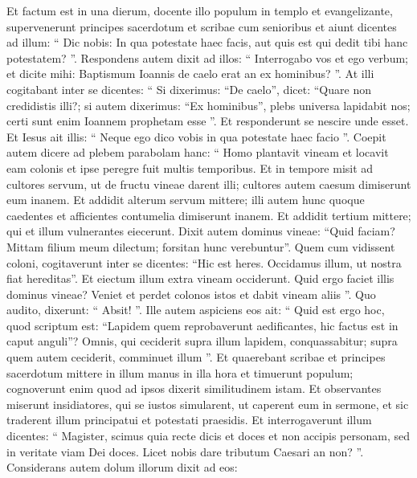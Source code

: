 \begin{biblechapter}
\begin{biblechapter}
\begin{biblechapter}
\begin{biblechapter}
\begin{biblechapter}
\begin{biblechapter}
\begin{biblechapter}
\begin{biblechapter}
\begin{biblechapter}
\begin{biblechapter}
\begin{biblechapter}
\begin{biblechapter}
\begin{biblechapter}
\begin{biblechapter}
\begin{biblechapter}
\begin{biblechapter}
\begin{biblechapter}
\begin{biblechapter}
\begin{biblechapter}
\begin{biblechapter}
\verse Et factum est in una dierum, docente illo populum in templo et evangelizante, supervenerunt principes sacerdotum et scribae cum senioribus 
 \verse et aiunt dicentes ad illum: “ Dic nobis: In qua potestate haec facis, aut quis est qui dedit tibi hanc potestatem? ”. 
\verse Respondens autem dixit ad illos: “ Interrogabo vos et ego verbum; et dicite mihi: 
\verse Baptismum Ioannis de caelo erat an ex hominibus? ”. 
\verse At illi cogitabant inter se dicentes: “ Si dixerimus: “De caelo”, dicet: “Quare non credidistis illi?; 
\verse si autem dixerimus: “Ex hominibus”, plebs universa lapidabit nos; certi sunt enim Ioannem prophetam esse ”. 
\verse Et responderunt se nescire unde esset. 
\verse Et Iesus ait illis: “ Neque ego dico vobis in qua potestate haec facio ”.
 \verse Coepit autem dicere ad plebem parabolam hanc: “ Homo plantavit vineam et locavit eam colonis et ipse peregre fuit multis temporibus. 
\verse Et in tempore misit ad cultores servum, ut de fructu vineae darent illi; cultores autem caesum dimiserunt eum inanem. 
\verse Et addidit alterum servum mittere; illi autem hunc quoque caedentes et afficientes contumelia dimiserunt inanem. 
\verse Et addidit tertium mittere; qui et illum vulnerantes eiecerunt. 
\verse Dixit autem dominus vineae: “Quid faciam? Mittam filium meum dilectum; forsitan hunc verebuntur”. 
\verse Quem cum vidissent coloni, cogitaverunt inter se dicentes: “Hic est heres. Occidamus illum, ut nostra fiat hereditas”. 
\verse Et eiectum illum extra vineam occiderunt. Quid ergo faciet illis dominus vineae? 
\verse Veniet et perdet colonos istos et dabit vineam aliis ”.
 Quo audito, dixerunt: “ Absit! ”. 
\verse Ille autem aspiciens eos ait: “ Quid est ergo hoc, quod scriptum est:
 “Lapidem quem reprobaverunt aedificantes,
 hic factus est in caput anguli”?
 \verse Omnis, qui ceciderit supra illum lapidem, conquassabitur; supra quem autem ceciderit, comminuet illum ”. 
\verse Et quaerebant scribae et principes sacerdotum mittere in illum manus in illa hora et timuerunt populum; cognoverunt enim quod ad ipsos dixerit similitudinem istam.
 \verse Et observantes miserunt insidiatores, qui se iustos simularent, ut caperent eum in sermone, et sic traderent illum principatui et potestati praesidis. 
 \verse Et interrogaverunt illum dicentes: “ Magister, scimus quia recte dicis et doces et non accipis personam, sed in veritate viam Dei doces. 
\verse Licet nobis dare tributum Caesari an non? ”. 
\verse Considerans autem dolum illorum dixit ad eos: 

\end{biblechapter}
\end{biblechapter}
\end{biblechapter}
\end{biblechapter}
\end{biblechapter}
\end{biblechapter}
\end{biblechapter}
\end{biblechapter}
\end{biblechapter}
\end{biblechapter}
\end{biblechapter}
\end{biblechapter}
\end{biblechapter}
\end{biblechapter}
\end{biblechapter}
\end{biblechapter}
\end{biblechapter}
\end{biblechapter}
\end{biblechapter}
\end{biblechapter}
